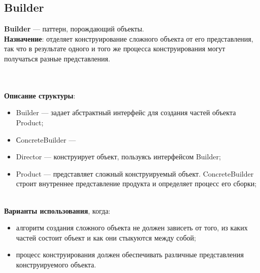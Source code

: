 \documentclass[a3paper,11pt]{report}
\def \sboxSize {5cm}
\newcommand{\umlnoteND}[6]{
	\node[umlcd style, anchor=north, draw, shape=umlcdnote, text width=#2] at (#1) (note) {#3};
	\draw [umlcd style dashed line , ] (note.#4) ++(#5) --++(#6) coordinate(tmp) node[circle,inner sep=0pt,draw, fill=black!1, minimum size=5pt] (NoD) { };
}
\newcommand\tab[1][1cm]{\hspace*{#1}}
\begin{document}
\newpage
\subsection{Builder}

\large\textbf{Builder} --- паттерн, порождающий объекты.
\\
\large\textbf{Назначение}: отделяет конструирование сложного объекта от его представления, так что в результате одного и того же процесса конструирования могут получаться разные представления.
\\
  
\\\\
\textbf{Описание структуры}:
\begin{itemize}
\item Builder --- задает абстрактный интерфейс для создания частей объекта Product;
\item СoncreteBuilder ---
\item Director --- конструирует объект, пользуясь интерфейсом Builder;
\item Product --- представляет сложный конструируемый объект. ConcreteBuilder строит внутреннее представление продукта и определяет процесс его сборки;
\end{itemize}

\large\textbf{\\Варианты использования}, когда:
\begin{itemize}
\item алгоритм создания сложного объекта не должен зависеть от того, из каких частей состоит объект и как они стыкуются между собой;
\item процесс конструирования должен обеспечивать различные представления конструируемого объекта.
\end{itemize}
\end{document}

